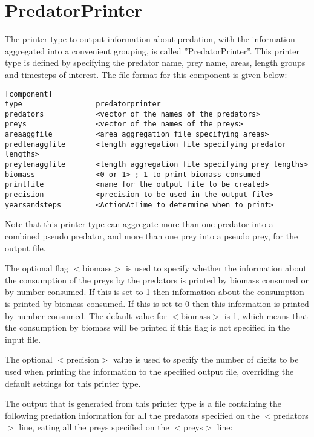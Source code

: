 \documentclass[10pt,twoside]{book}
\begin{document}
\section{PredatorPrinter}\label{sec:predatorprinter}
The printer type to output information about predation, with the information aggregated into a convenient grouping, is called ''PredatorPrinter''.  This printer type is defined by specifying the predator name, prey name, areas, length groups and timesteps of interest.  The file format for this component is given below:

{\small\begin{verbatim}
[component]
type                 predatorprinter
predators            <vector of the names of the predators>
preys                <vector of the names of the preys>
areaaggfile          <area aggregation file specifying areas>
predlenaggfile       <length aggregation file specifying predator lengths>
preylenaggfile       <length aggregation file specifying prey lengths>
biomass              <0 or 1> ; 1 to print biomass consumed
printfile            <name for the output file to be created>
precision            <precision to be used in the output file>
yearsandsteps        <ActionAtTime to determine when to print>
\end{verbatim}}

Note that this printer type can aggregate more than one predator into a combined pseudo predator, and more than one prey into a pseudo prey, for the output file.

\bigskip
The optional flag $<$biomass$>$ is used to specify whether the information about the consumption of the preys by the predators is printed by biomass consumed or by number consumed.  If this is set to 1 then information about the consumption is printed by biomass consumed.  If this is set to 0 then this information is printed by number consumed.  The default value for $<$biomass$>$ is 1, which means that the consumption by biomass will be printed if this flag is not specified in the input file.

\bigskip
The optional $<$precision$>$ value is used to specify the number of digits to be used when printing the information to the specified output file, overriding the default settings for this printer type.

\bigskip
The output that is generated from this printer type is a file containing the following predation information for all the predators specified on the $<$predators$>$ line, eating all the preys specified on the $<$preys$>$ line:
\end{document}
